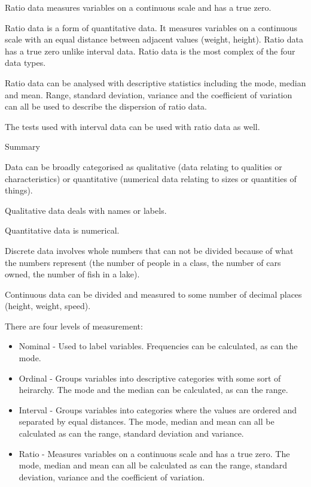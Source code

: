 \documentclass[
]{book}
\begin{document}
Ratio data measures variables on a continuous scale and has a true zero.

Ratio data is a form of quantitative data. It measures variables on a continuous scale with an equal distance between adjacent values (weight, height). Ratio data has a true zero unlike interval data. Ratio data is the most complex of the four data types.

Ratio data can be analysed with descriptive statistics including the mode, median and mean. Range, standard deviation, variance and the coefficient of variation can all be used to describe the dispersion of ratio data.

The tests used with interval data can be used with ratio data as well.

Summary

Data can be broadly categorised as qualitative (data relating to qualities or characteristics) or quantitative (numerical data relating to sizes or quantities of things).

Qualitative data deals with names or labels.

Quantitative data is numerical.

Discrete data involves whole numbers that can not be divided because of what the numbers represent (the number of people in a class, the number of cars owned, the number of fish in a lake).

Continuous data can be divided and measured to some number of decimal places (height, weight, speed).

There are four levels of measurement:

\begin{itemize}
\item
  Nominal - Used to label variables. Frequencies can be calculated, as can the mode.
\item
  Ordinal - Groups variables into descriptive categories with some sort of heirarchy. The mode and the median can be calculated, as can the range.
\item
  Interval - Groups variables into categories where the values are ordered and separated by equal distances. The mode, median and mean can all be calculated as can the range, standard deviation and variance.
\item
  Ratio - Measures variables on a continuous scale and has a true zero. The mode, median and mean can all be calculated as can the range, standard deviation, variance and the coefficient of variation.
\end{itemize}
\end{document}
